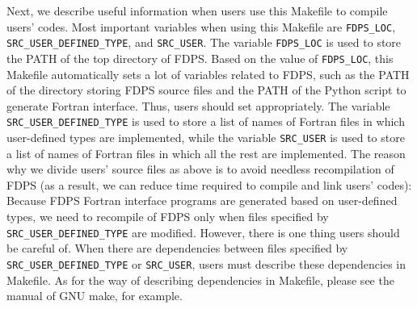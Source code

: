 \ifFtn %
Next, we describe useful information when users use this Makefile to compile users' codes. Most important variables when using this Makefile are \texttt{FDPS\_LOC}, \texttt{SRC\_USER\_DEFINED\_TYPE}, and \texttt{SRC\_USER}. The variable \texttt{FDPS\_LOC} is used to store the PATH of the top directory of FDPS. Based on the value of \texttt{FDPS\_LOC}, this Makefile automatically sets a lot of variables related to FDPS, such as the PATH of the directory storing FDPS source files and the PATH of the Python script to generate Fortran interface. Thus, users should set appropriately. The variable \texttt{SRC\_USER\_DEFINED\_TYPE} is used to store a list of names of Fortran files in which user-defined types are implemented, while the variable \texttt{SRC\_USER} is used to store a list of names of Fortran files in which all the rest are implemented. The reason why we divide users' source files as above is to avoid needless recompilation of FDPS (as a result, we can reduce time required to compile and link users' codes): Because FDPS Fortran interface programs are generated based on user-defined types, we need to recompile of FDPS only when files specified by \texttt{SRC\_USER\_DEFINED\_TYPE} are modified. However, there is one thing users should be careful of. When there are dependencies between files specified by \texttt{SRC\_USER\_DEFINED\_TYPE} or \texttt{SRC\_USER}, users must describe these dependencies in Makefile. As for the way of describing dependencies in Makefile, please see the manual of GNU make, for example.

